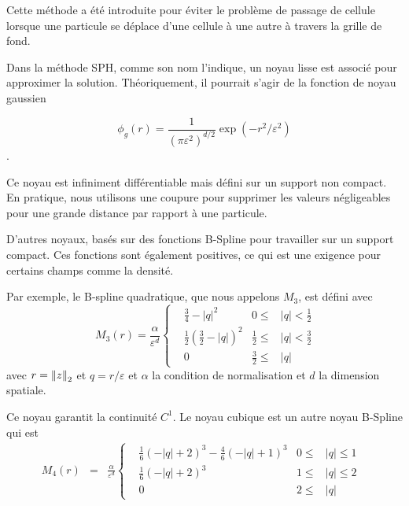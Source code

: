 Cette méthode a été introduite pour éviter le problème de passage de cellule lorsque une particule se déplace d'une cellule à une autre à travers la grille de fond.

Dans la méthode SPH, comme son nom l'indique, un noyau lisse est associé pour approximer la solution. Théoriquement, il pourrait s'agir de la fonction de noyau gaussien

\begin{equation*}
    \phi_g(r) = \frac{1}{{(\pi \varepsilon^2)}^{d/2}} \exp(-r^2/\varepsilon^2)
\end{equation*}.

Ce noyau est infiniment différentiable mais défini sur un support non compact. En pratique, nous utilisons une coupure pour supprimer les valeurs négligeables pour une grande distance par rapport à une particule.

D'autres noyaux, basés sur des fonctions B-Spline pour travailler sur un support compact. Ces fonctions sont également positives, ce qui est une exigence pour certains champs comme la densité.

Par exemple, le B-spline quadratique, que nous appelons $M_3$, est défini avec
\begin{equation}~\label{quadratic_kernel}
    M_3(r) = \frac{\alpha}{\varepsilon^d}\left\{ \begin{aligned}
         & \frac{3}{4} - |q|^2                            & 0 \leq           & |q| < \frac{1}{2} \\
         & \frac{1}{2} {\left(\frac{3}{2} - |q|\right)}^2 & \frac{1}{2} \leq & |q| < \frac{3}{2} \\
         & 0                                              & \frac{3}{2} \leq & |q|
    \end{aligned}
    \right.
\end{equation}avec $r = \left\lVert z \right\rVert_2 $ et $q = r / \varepsilon$ et $\alpha$ la condition de normalisation et $d$ la dimension spatiale.

Ce noyau garantit la continuité $C^1$.
Le noyau cubique est un autre noyau B-Spline qui est
\begin{eqnarray}~\label{cubic_kernel}
    M_4(r) &=&  \frac{\alpha}{\varepsilon^d} \left\{ \begin{aligned}
         & \frac{1}{6}{(-|q|+2)}^3 - \frac{4}{6}{(-|q|+1)}^3 & 0 \leq      & |q| \leq  1 & \\
         & \frac{1}{6}{(- |q|+2)}^3                          & 1      \leq & |q| \leq 2  & \\
         & 0                                                 & 2 \leq      & |q|
    \end{aligned}
    \right.
\end{eqnarray}

